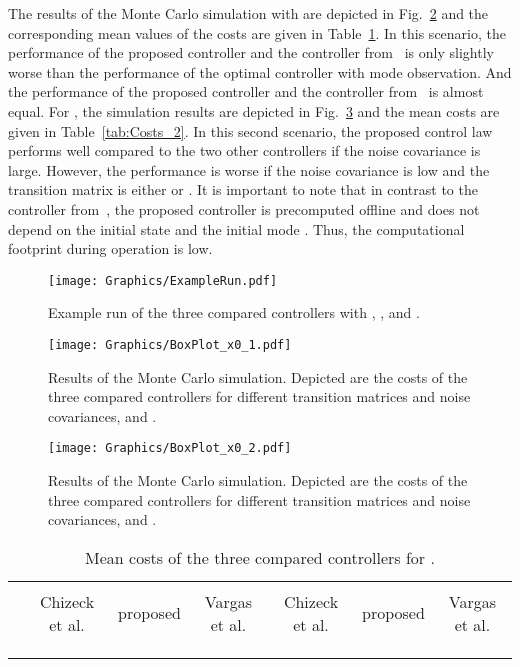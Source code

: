 \documentclass[preprint,1p,11pt]{IR-Template/ISAS_IR}
\begin{document}
The results of the Monte Carlo simulation with  are depicted in Fig.~\ref{fig:MC_x0_1} and the corresponding mean values of the costs are given in Table~\ref{tab:Costs_1}. In this scenario, the performance of the proposed controller and the controller from~\cite{Vargas_2013} is only slightly worse than the performance of the optimal controller with mode observation. And the performance of the proposed controller and the controller from~\cite{Vargas_2013} is almost equal. For , the simulation results are depicted in Fig.~\ref{fig:MC_x0_2} and the mean costs are given in Table~\ref{tab:Costs_2}. In this second scenario, the proposed control law performs well compared to the two other controllers if the noise covariance is large. However, the performance is worse if the noise covariance is low and the transition matrix is either  or . It is important to note that in contrast to the controller from~\cite{Vargas_2013}, the proposed controller is precomputed offline and does not depend on the initial state  and the initial mode . Thus, the computational footprint during operation is low.\\

\begin{figure}[h]
\centering
\texttt{[image: Graphics/ExampleRun.pdf]}
\caption{Example run of the three compared controllers with , , and .}
\label{fig:ExampleRun}
\end{figure}

\begin{figure}[h]
\centering
\texttt{[image: Graphics/BoxPlot\_x0\_1.pdf]}
\caption{Results of the Monte Carlo simulation. Depicted are the costs of the three compared controllers for different transition matrices and noise covariances, and .}
\label{fig:MC_x0_1}
\end{figure}

\begin{figure}[h]
\centering
\texttt{[image: Graphics/BoxPlot\_x0\_2.pdf]}
\caption{Results of the Monte Carlo simulation. Depicted are the costs of the three compared controllers for different transition matrices and noise covariances, and .}
\label{fig:MC_x0_2}
\end{figure}

\begin{table}[h]
\centering
\begin{tabular}{ccccccc}
\toprule
& \multicolumn{3}{c}{} & \multicolumn{3}{c}{}\\ \cmidrule{2-7}
& Chizeck et al. & proposed & Vargas et al.& Chizeck et al. & proposed & Vargas et al.\\\cmidrule{1-7}
\multicolumn{1}{c}{}&  &  &  &  &  &  \\
\cmidrule{1-7}
\multicolumn{1}{c}{}&  &  &  &  &  &  \\
\cmidrule{1-7}
\multicolumn{1}{c}{}&  &  &  &  &  &  \\
\bottomrule
\end{tabular}
\caption{Mean costs of the three compared controllers for .}
\label{tab:Costs_1}
\end{table}
\end{document}
